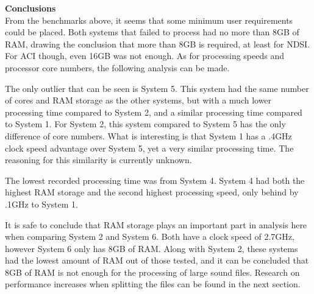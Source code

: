\noindent\textbf{Conclusions}\\
From the benchmarks above, it seems that some minimum user requirements could be placed. Both systems that failed to process had no more than 8GB of RAM, drawing the conclusion that more than 8GB is required, at least for NDSI. For ACI though, even 16GB was not enough. As for processing speeds and processor core numbers, the following analysis can be made.\par
The only outlier that can be seen is System 5. This system had the same number of cores and RAM storage as the other systems, but with a much lower processing time compared to System 2, and a similar processing time compared to System 1. For System 2, this system compared to System 5 has the only difference of core numbers. What is interesting is that System 1 has a .4GHz clock speed advantage over System 5, yet a very similar processing time. The reasoning for this similarity is currently unknown.\par
The lowest recorded processing time was from System 4. System 4 had both the highest RAM storage and the second highest processing speed, only behind by .1GHz to System 1.\par
It is safe to conclude that RAM storage plays an important part in analysis here when comparing System 2 and System 6. Both have a clock speed of 2.7GHz, however System 6 only has 8GB of RAM. Along with System 2, these systems had the lowest amount of RAM out of those tested, and it can be concluded that 8GB of RAM is not enough for the processing of large sound files. Research on performance increases when splitting the files can be found in the next section.\par


